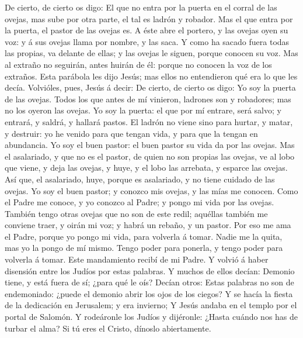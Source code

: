  De cierto, de cierto os digo: El que no entra por la puerta
en el corral de las ovejas, mas sube por otra parte, el tal es ladrón y
robador.  Mas el que entra por la puerta, el pastor de las
ovejas es.  A éste abre el portero, y las ovejas oyen su
voz: y á sus ovejas llama por nombre, y las saca.  Y como ha
sacado fuera todas las propias, va delante de ellas; y las ovejas le
siguen, porque conocen su voz.  Mas al extraño no seguirán,
antes huirán de él: porque no conocen la voz de los extraños.
 Esta parábola les dijo Jesús; mas ellos no entendieron qué
era lo que les decía.  Volvióles, pues, Jesús á decir: De
cierto, de cierto os digo: Yo soy la puerta de las ovejas. 
Todos los que antes de mí vinieron, ladrones son y robadores; mas no los
oyeron las ovejas.  Yo soy la puerta: el que por mí entrare,
será salvo; y entrará, y saldrá, y hallará pastos.  El
ladrón no viene sino para hurtar, y matar, y destruir: yo he venido para
que tengan vida, y para que la tengan en abundancia.  Yo
soy el buen pastor: el buen pastor su vida da por las ovejas.
 Mas el asalariado, y que no es el pastor, de quien no son
propias las ovejas, ve al lobo que viene, y deja las ovejas, y huye, y
el lobo las arrebata, y esparce las ovejas.  Así que, el
asalariado, huye, porque es asalariado, y no tiene cuidado de las
ovejas.  Yo soy el buen pastor; y conozco mis ovejas, y las
mías me conocen.  Como el Padre me conoce, y yo conozco al
Padre; y pongo mi vida por las ovejas.  También tengo otras
ovejas que no son de este redil; aquéllas también me conviene traer, y
oirán mi voz; y habrá un rebaño, y un pastor.  Por eso me
ama el Padre, porque yo pongo mi vida, para volverla á tomar.
 Nadie me la quita, mas yo la pongo de mí mismo. Tengo
poder para ponerla, y tengo poder para volverla á tomar. Este
mandamiento recibí de mi Padre.  Y volvió á haber disensión
entre los Judíos por estas palabras.  Y muchos de ellos
decían: Demonio tiene, y está fuera de sí; ¿para qué le oís?
 Decían otros: Estas palabras no son de endemoniado: ¿puede
el demonio abrir los ojos de los ciegos?  Y se hacía la
fiesta de la dedicación en Jerusalem; y era invierno;  Y
Jesús andaba en el templo por el portal de Salomón.  Y
rodeáronle los Judíos y dijéronle: ¿Hasta cuándo nos has de turbar el
alma? Si tú eres el Cristo, dínoslo abiertamente. 
